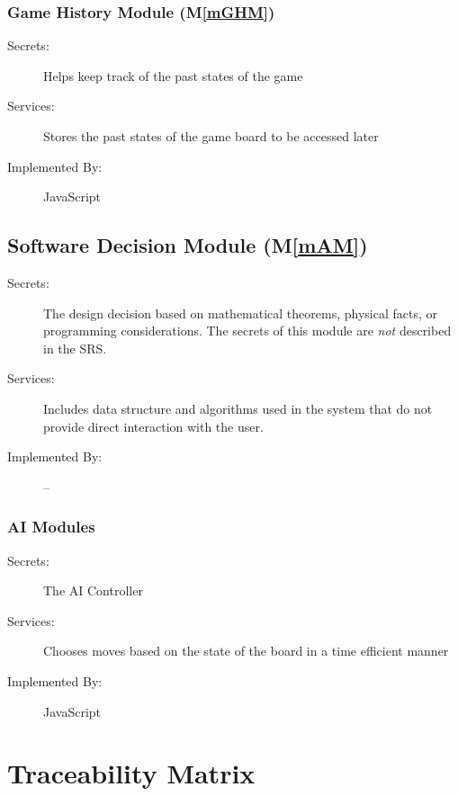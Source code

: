 \documentclass[12pt, titlepage]{article}
\newcommand{\mref}[1]{M\ref{#1}}
\begin{document}
{\subsubsection{Game History Module  (\mref{mGHM})}

\begin{description}
\item[Secrets:]{\color{blue}Helps keep track of the past states of the game}
\item[Services:]Stores the past states of the game board to be accessed later
\item[Implemented By:] JavaScript
\end{description}


\subsection{Software Decision Module  (\mref{mAM})}

\begin{description}
\item[Secrets:] The design decision based on mathematical theorems, physical
  facts, or programming considerations. The secrets of this module are
  \emph{not} described in the SRS.
\item[Services:] Includes data structure and algorithms used in the system that
  do not provide direct interaction with the user. 
\item[Implemented By:] --
\end{description}

\subsubsection{AI Modules}

\begin{description}
\item[Secrets:]The AI Controller
\item[Services:]Chooses moves based on the state of the board in a time efficient manner
\item[Implemented By:] JavaScript
\end{description}

\section{Traceability Matrix} \label{SecTM}

}
\end{document}

